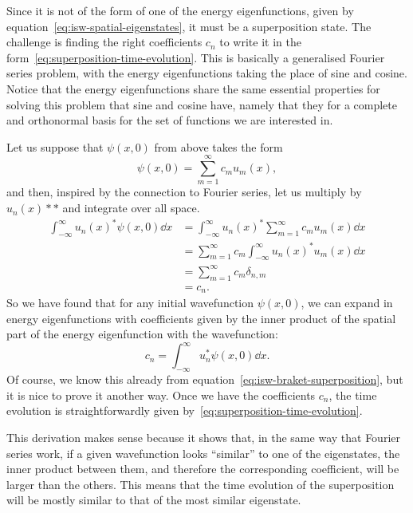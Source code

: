 \documentclass[../quantum_mechanics.tex]{subfiles}
\begin{document}
            Since it is not of the form of one of the energy eigenfunctions, given by equation~\ref{eq:isw-spatial-eigenstates}, it must be a superposition state.
            The challenge is finding the right coefficients $c_n$ to write it in the form~\ref{eq:superposition-time-evolution}.
            This is basically a generalised Fourier series problem, with the energy eigenfunctions taking the place of sine and cosine.
            Notice that the energy eigenfunctions share the same essential properties for solving this problem that sine and cosine have, namely that they for a complete and orthonormal basis for the set of functions we are interested in.

            Let us suppose that $\psi(x,0)$ from above takes the form
            \begin{equation}
                \psi(x,0)=\sum_{m=1}^\infty c_mu_m(x),
            \end{equation}
            and then, inspired by the connection to Fourier series, let us multiply by $u_n(x)*\ast$ and integrate over all space.
            \begin{align}
                \int_{-\infty}^\infty u_n(x)^\ast\psi(x,0)\dd{x}&=\int_{-\infty}^\infty u_n(x)^\ast\sum_{m=1}^\infty c_mu_m(x)\dd{x}\\
                &=\sum_{m=1}^\infty c_m\int_{-\infty}^\infty u_n(x)^\ast u_m(x)\dd{x}\\
                &=\sum_{m=1}^\infty c_m\delta_{n,m}\\
                &=c_n.
            \end{align}
            So we have found that for any initial wavefunction $\psi(x,0)$, we can expand in energy eigenfunctions with coefficients given by the inner product of the spatial part of the energy eigenfunction with the wavefunction:
            \begin{equation}
                c_n=\int_{-\infty}^\infty u_n^\ast\psi(x,0)\dd{x}.
            \end{equation}
            Of course, we know this already from equation~\ref{eq:isw-braket-superposition}, but it is nice to prove it another way.
            Once we have the coefficients $c_n$, the time evolution is straightforwardly given by~\ref{eq:superposition-time-evolution}.

            This derivation makes sense because it shows that, in the same way that Fourier series work, if a given wavefunction looks ``similar'' to one of the eigenstates, the inner product between them, and therefore the corresponding coefficient, will be larger than the others.
            This means that the time evolution of the superposition will be mostly similar to that of the most similar eigenstate.
\end{document}
